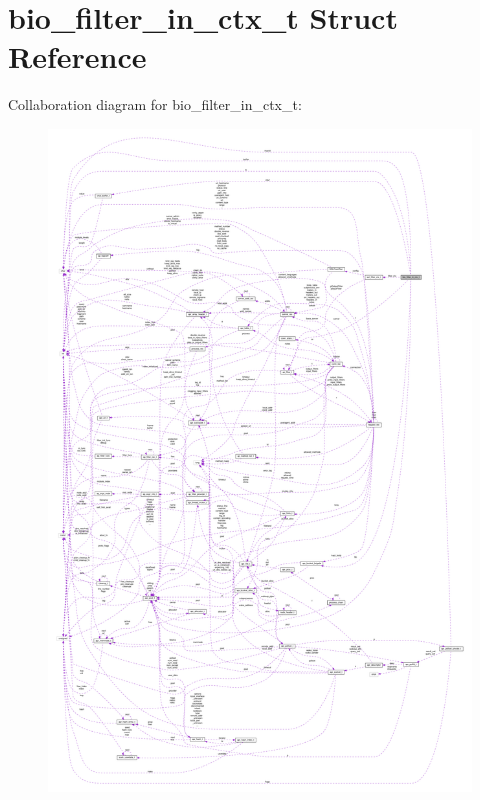 \hypertarget{structbio__filter__in__ctx__t}{}\section{bio\+\_\+filter\+\_\+in\+\_\+ctx\+\_\+t Struct Reference}
\label{structbio__filter__in__ctx__t}


Collaboration diagram for bio\+\_\+filter\+\_\+in\+\_\+ctx\+\_\+t\+:
\nopagebreak
\begin{figure}[H]
\begin{center}
\leavevmode
\includegraphics[width=350pt]{structbio__filter__in__ctx__t__coll__graph}
\end{center}
\end{figure}
